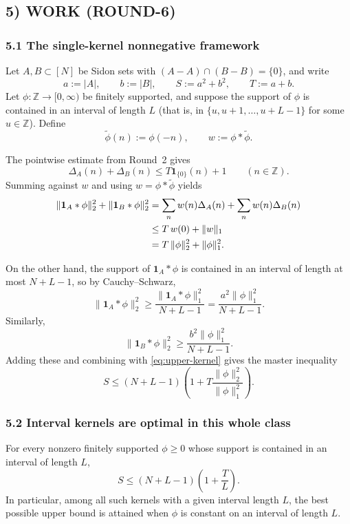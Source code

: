 \subsection{5) WORK (ROUND-6)}

\subsubsection{5.1 The single-kernel nonnegative framework}

Let $A,B\subset[N]$ be Sidon sets with $(A-A)\cap(B-B)=\{0\}$, and write
\[
a:=|A|,\qquad b:=|B|,\qquad S:=a^2+b^2,\qquad T:=a+b.
\]
Let $\phi:\mathbb Z\to [0,\infty)$ be finitely supported, and suppose the support of $\phi$ is contained in an interval of length $L$ (that is, in $\{u,u+1,\dots,u+L-1\}$ for some $u\in\mathbb Z$).  Define
\[
\widetilde\phi(n):=\phi(-n),\qquad w:=\phi*\widetilde\phi.
\]

The pointwise estimate from Round~2 gives
\[
\Delta_A(n)+\Delta_B(n)\le T\mathbf 1_{\{0\}}(n)+1
\qquad (n\in\mathbb Z).
\]
Summing against $w$ and using $w=\phi*\widetilde\phi$ yields
\begin{align}
\|\mathbf 1_A*\phi\|_2^2+\|\mathbf 1_B*\phi\|_2^2
&=\sum_n w(n)\Delta_A(n)+\sum_n w(n)\Delta_B(n)\notag\\
&\le T\,w(0)+\|w\|_1\notag\\
&= T\,\|\phi\|_2^2+\|\phi\|_1^2.
\label{eq:upper-kernel}
\end{align}

On the other hand, the support of $\mathbf 1_A*\phi$ is contained in an interval of length at most $N+L-1$, so by Cauchy--Schwarz,
\[
\|\mathbf 1_A*\phi\|_2^2\ge \frac{\|\mathbf 1_A*\phi\|_1^2}{N+L-1}
=\frac{a^2\|\phi\|_1^2}{N+L-1}.
\]
Similarly,
\[
\|\mathbf 1_B*\phi\|_2^2\ge \frac{b^2\|\phi\|_1^2}{N+L-1}.
\]
Adding these and combining with \eqref{eq:upper-kernel} gives the master inequality
\begin{equation}
\label{eq:master-kernel}
S\le (N+L-1)\left(1+T\frac{\|\phi\|_2^2}{\|\phi\|_1^2}\right).
\end{equation}

\subsubsection{5.2 Interval kernels are optimal in this whole class}

\begin{lemma}
\label{lem:kernelbarrier}
For every nonzero finitely supported $\phi\ge 0$ whose support is contained in an interval of length $L$,
\begin{equation}
\label{eq:barrier1}
S\le (N+L-1)\left(1+\frac{T}{L}\right).
\end{equation}
In particular, among all such kernels with a given interval length $L$, the best possible upper bound is attained when $\phi$ is constant on an interval of length $L$.
\end{lemma}

